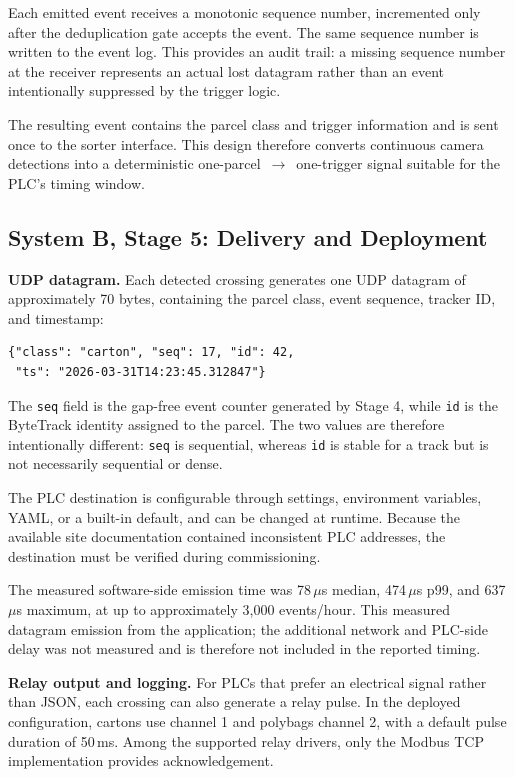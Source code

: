 \documentclass[9pt,a4paper,twocolumn]{rho-class/rho}
\begin{document}
Each emitted event receives a monotonic sequence number, incremented only after the deduplication gate accepts the event. The same sequence number is written to the event log. This provides an audit trail: a missing sequence number at the receiver represents an actual lost datagram rather than an event intentionally suppressed by the trigger logic.

The resulting event contains the parcel class and trigger information and is sent once to the sorter interface. This design therefore converts continuous camera detections into a deterministic one-parcel~$\to$~one-trigger signal suitable for the PLC's timing window.

\subsection{System B, Stage 5: Delivery and Deployment}

\textbf{UDP datagram.} Each detected crossing generates one UDP datagram of approximately 70 bytes, containing the parcel class, event sequence, tracker ID, and timestamp:

{\footnotesize
\begin{verbatim}
{"class": "carton", "seq": 17, "id": 42,
 "ts": "2026-03-31T14:23:45.312847"}
\end{verbatim}
}

\noindent The \texttt{seq} field is the gap-free event counter generated by Stage 4, while \texttt{id} is the ByteTrack identity assigned to the parcel. The two values are therefore intentionally different: \texttt{seq} is sequential, whereas \texttt{id} is stable for a track but is not necessarily sequential or dense.

The PLC destination is configurable through settings, environment variables, YAML, or a built-in default, and can be changed at runtime. Because the available site documentation contained inconsistent PLC addresses, the destination must be verified during commissioning.

The measured software-side emission time was 78\,$\mu$s median, 474\,$\mu$s p99, and 637\,$\mu$s maximum, at up to approximately 3{,}000 events/hour. This measured datagram emission from the application; the additional network and PLC-side delay was not measured and is therefore not included in the reported timing.

\textbf{Relay output and logging.} For PLCs that prefer an electrical signal rather than JSON, each crossing can also generate a relay pulse. In the deployed configuration, cartons use channel 1 and polybags channel 2, with a default pulse duration of 50\,ms. Among the supported relay drivers, only the Modbus TCP implementation provides acknowledgement.
\end{document}
